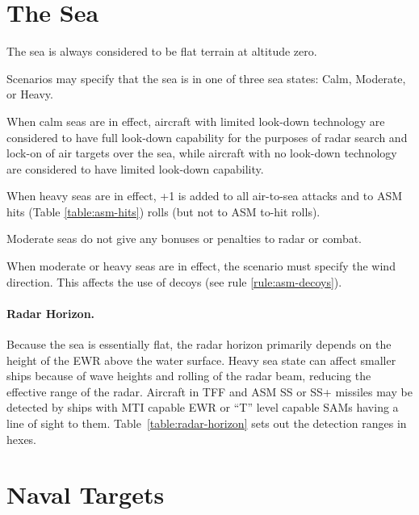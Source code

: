 

\label{rule:naval-units}

\section{The Sea}

The sea is always considered to be flat terrain at altitude zero. 

Scenarios may specify that the sea is in one of three sea states: Calm, Moderate, or Heavy.   

When calm seas are in effect, aircraft with limited look-down technology are considered to have full look-down capability for the purposes of radar search and lock-on of air targets over the sea, while aircraft with no look-down technology are considered to have limited look-down capability.  

When heavy seas are in effect, +1 is added to all air-to-sea attacks and to ASM hits (Table \ref{table:asm-hits}) rolls (but not to ASM to-hit rolls).  

Moderate seas do not give any bonuses or penalties to radar or combat.

When moderate or heavy seas are in effect, the scenario must specify the wind direction.  This affects the use of decoys (see rule \ref{rule:asm-decoys}).

\paragraph{Radar Horizon.} 

Because the sea is essentially flat, the radar horizon primarily depends on the height of the EWR above the water surface.  Heavy sea state can affect smaller ships because of wave heights and rolling of the radar beam, reducing the effective range of the radar.  Aircraft in TFF and ASM SS or SS+ missiles may be detected by ships with MTI capable EWR or “T” level capable SAMs having a line of sight to them. Table~\ref{table:radar-horizon} sets out the detection ranges in hexes.



\section{Naval Targets}

